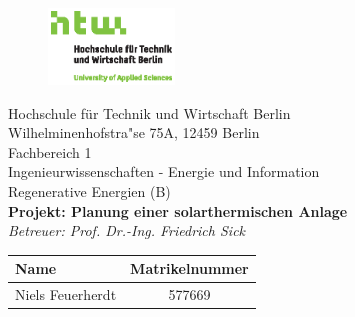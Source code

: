 \begin{titlepage}

    \begin{figure}[h] 
            \begin{flushright}
        \includegraphics[width=0.3\textwidth]{Abbildungen/HTWLogo.eps}\\
            \end{flushright}
    \end{figure}
\begin{center}
    \vspace*{\fill}
    {\Large Hochschule f{\"u}r Technik und Wirtschaft Berlin}\\
        \bigskip
        Wilhelminenhofstra"se 75A, 12459 Berlin\\
        \bigskip
    Fachbereich 1 \\Ingenieurwissenschaften - Energie und Information\\Regenerative Energien (B)\\
    \vfill
     \textcolor{HTWGreen}{\textbf{\Large{Projekt: Planung einer solarthermischen Anlage}}}\\
    \textit{Betreuer: Prof. Dr.-Ing. Friedrich Sick}\\
\vfill
\end{center}
\vfill
\begin{table}[H]
        \centering
        \begin{tabular}{|l|c|}
        \hline
        \rowcolor[cmyk]{0.55, 0.00, 1.00, 0.00} \textbf{Name} & \textbf{Matrikelnummer}  \\
        \hline
        Niels Feuerherdt      & 577669\\
        \hline
        \end{tabular}
        \end{table}
\end{titlepage}
